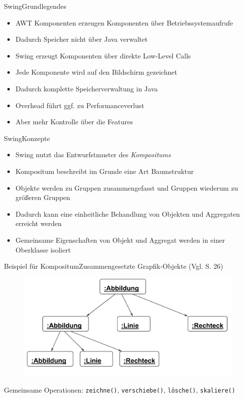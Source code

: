 \begin{frame}{Swing}{Grundlegendes}
	\begin{itemize}
		\item AWT Komponenten erzeugen Komponenten über Betriebssystemaufrufe
		\item Dadurch Speicher nicht über Java verwaltet
		\item Swing erzeugt Komponenten über direkte Low-Level Calls
		\item Jede Komponente wird auf den Bildschirm gezeichnet
		\item Dadurch komplette Speicherverwaltung in Java
		\item Overhead führt ggf. zu Performanceverlust
		\item Aber mehr Kontrolle über die Features
	\end{itemize}
\end{frame}

\begin{frame}{Swing}{Konzepte}
	\begin{itemize}
		\item Swing nutzt das Entwurfstmuster des \textit{Kompositums}
		\item Kompositum beschreibt im Grunde eine Art Baumstruktur
		\item Objekte werden zu Gruppen zusammengefasst und Gruppen wiederum zu größeren Gruppen
		\item Dadurch kann eine einheitliche Behandlung von Objekten und Aggregaten erreicht werden
		\item Gemeinsame Eigenschaften von Objekt und Aggregat werden in einer Oberklasse isoliert
	\end{itemize}
\end{frame}

\begin{frame}{Beispiel für Kompositum}{Zusammengesetzte Grapfik-Objekte (Vgl. \cite{judt2017} S. 26)}
    \begin{figure}
	\includegraphics*[width=.7\textwidth]{graph/compositum_example}
    \end{figure}
	Gemeinsame Operationen: \texttt{zeichne()}, \texttt{verschiebe()}, \texttt{lösche()}, \texttt{skaliere()}
\end{frame}


